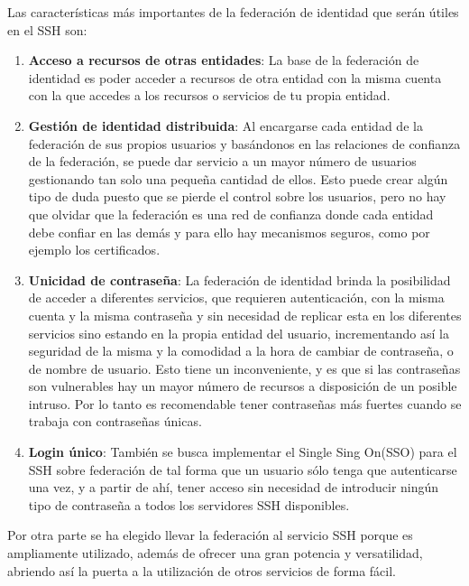 Las características más importantes de la federación de identidad que
serán útiles en el SSH son:
\begin{enumerate}

    \item \textbf{Acceso a recursos de otras entidades}: La base de la
    federación de identidad es poder acceder a recursos de otra
    entidad con la misma cuenta con la que accedes a los recursos o
    servicios de tu propia entidad.

    \item \textbf{Gestión de identidad distribuida}: Al encargarse
    cada entidad de la federación de sus propios usuarios y
    basándonos en las relaciones de confianza de la federación, se
    puede dar servicio a un mayor número de usuarios gestionando tan
    solo una pequeña cantidad de ellos. Esto puede crear algún tipo de
    duda puesto que se pierde el control sobre los usuarios, pero no
    hay que olvidar que la federación es una red de confianza donde
    cada entidad debe confiar en las demás y para ello hay mecanismos
    seguros, como por ejemplo los certificados.

    \item \textbf{Unicidad de contraseña}: La federación de identidad
    brinda la posibilidad de acceder a diferentes servicios, que
    requieren autenticación, con la misma cuenta y la misma
    contraseña y sin necesidad de replicar esta en los diferentes
    servicios sino estando en la propia entidad del usuario, incrementando así la
    seguridad de la misma y la comodidad a la hora de cambiar de
    contraseña, o de nombre de usuario. Esto tiene un inconveniente, y es
    que si las contraseñas son vulnerables hay un mayor número de recursos
    a disposición de un posible intruso. Por lo tanto es recomendable tener
    contraseñas más fuertes cuando se trabaja con contraseñas únicas.

    \item \textbf{Login único}: También se busca implementar el Single
    Sing On(SSO) para el SSH sobre federación de tal forma que un
    usuario sólo tenga que autenticarse una vez, y a partir de ahí,
    tener acceso sin necesidad de introducir ningún tipo de
    contraseña a todos los servidores SSH disponibles.

\end{enumerate}

Por otra parte se ha elegido llevar la federación al servicio SSH
porque es ampliamente utilizado, además de ofrecer una gran
potencia y versatilidad, abriendo así la puerta a la utilización de
otros servicios de forma fácil.

